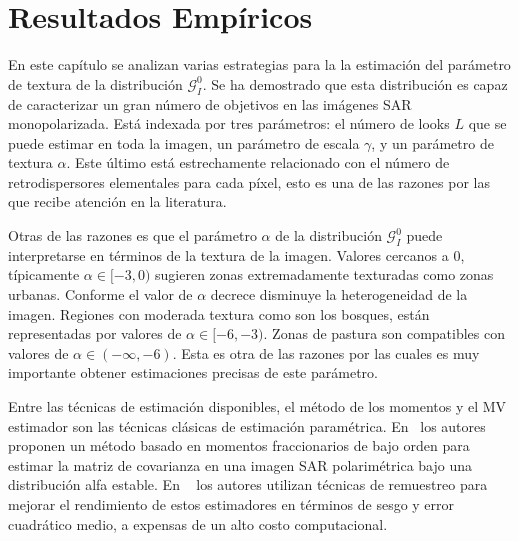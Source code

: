 
\chapter{Resultados Empíricos}
\label{ResultadosEmpiricos}


En este capítulo se analizan varias estrategias para la la estimación del parámetro de textura de la distribución $\mathcal{G}_I^0$.
Se ha demostrado que esta distribución es capaz de caracterizar un gran número de objetivos en las imágenes SAR monopolarizada. Está indexada por
tres parámetros: el número de looks $L$ que se puede estimar en toda la imagen, un parámetro de escala $\gamma$, y un parámetro de textura $\alpha$. Este último está estrechamente relacionado con el número
de retrodispersores elementales para cada píxel, esto es una de las razones por las que recibe atención en la literatura. 

Otras de las razones es que el parámetro $\alpha$ de la distribución $\mathcal{G}_I^0$ puede interpretarse en términos de la textura de la imagen. Valores cercanos a $0$, típicamente $\alpha \in [-3,0)$ sugieren zonas extremadamente texturadas como zonas urbanas. Conforme el valor de $\alpha$ decrece disminuye la heterogeneidad de la imagen. Regiones con moderada textura como son los bosques, están representadas por valores de $\alpha \in [-6,-3)$. Zonas de pastura son compatibles con valores de $\alpha \in (-\infty,-6)$. Esta es otra de las razones por las cuales es muy importante obtener estimaciones precisas de este parámetro.

Entre las técnicas de estimación disponibles, el método de los momentos y el MV estimador son las técnicas clásicas de estimación paramétrica. En~\cite{Bian2013} los autores proponen un método basado en
momentos fraccionarios de bajo orden para estimar la matriz de covarianza en una imagen SAR polarimétrica bajo una distribución alfa estable. En ~\cite{VasconcellosFrerySilva:CompStat,CribariFrerySilva:CSDA} los autores utilizan técnicas de remuestreo para mejorar el rendimiento de estos estimadores en términos de sesgo y error cuadrático medio, a expensas de un alto costo computacional.

